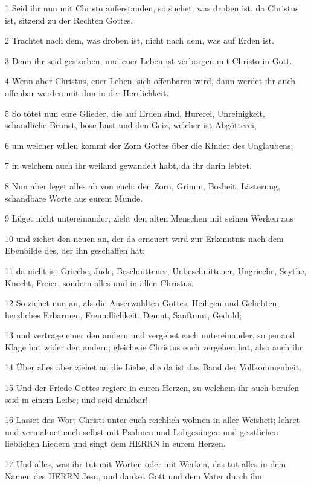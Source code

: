 \par 1 Seid ihr nun mit Christo auferstanden, so suchet, was droben ist, da Christus ist, sitzend zu der Rechten Gottes.
\par 2 Trachtet nach dem, was droben ist, nicht nach dem, was auf Erden ist.
\par 3 Denn ihr seid gestorben, und euer Leben ist verborgen mit Christo in Gott.
\par 4 Wenn aber Christus, euer Leben, sich offenbaren wird, dann werdet ihr auch offenbar werden mit ihm in der Herrlichkeit.
\par 5 So tötet nun eure Glieder, die auf Erden sind, Hurerei, Unreinigkeit, schändliche Brunst, böse Lust und den Geiz, welcher ist Abgötterei,
\par 6 um welcher willen kommt der Zorn Gottes über die Kinder des Unglaubens;
\par 7 in welchem auch ihr weiland gewandelt habt, da ihr darin lebtet.
\par 8 Nun aber leget alles ab von euch: den Zorn, Grimm, Bosheit, Lästerung, schandbare Worte aus eurem Munde.
\par 9 Lüget nicht untereinander; zieht den alten Menschen mit seinen Werken aus
\par 10 und ziehet den neuen an, der da erneuert wird zur Erkenntnis nach dem Ebenbilde des, der ihn geschaffen hat;
\par 11 da nicht ist Grieche, Jude, Beschnittener, Unbeschnittener, Ungrieche, Scythe, Knecht, Freier, sondern alles und in allen Christus.
\par 12 So ziehet nun an, als die Auserwählten Gottes, Heiligen und Geliebten, herzliches Erbarmen, Freundlichkeit, Demut, Sanftmut, Geduld;
\par 13 und vertrage einer den andern und vergebet euch untereinander, so jemand Klage hat wider den andern; gleichwie Christus euch vergeben hat, also auch ihr.
\par 14 Über alles aber ziehet an die Liebe, die da ist das Band der Vollkommenheit.
\par 15 Und der Friede Gottes regiere in euren Herzen, zu welchem ihr auch berufen seid in einem Leibe; und seid dankbar!
\par 16 Lasset das Wort Christi unter euch reichlich wohnen in aller Weisheit; lehret und vermahnet euch selbst mit Psalmen und Lobgesängen und geistlichen lieblichen Liedern und singt dem HERRN in eurem Herzen.
\par 17 Und alles, was ihr tut mit Worten oder mit Werken, das tut alles in dem Namen des HERRN Jesu, und danket Gott und dem Vater durch ihn.
